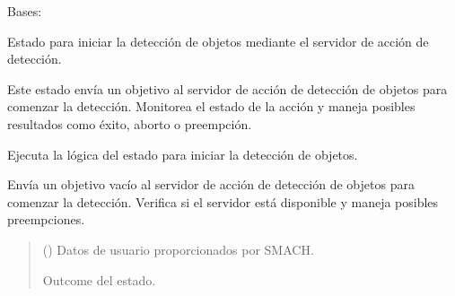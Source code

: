 \documentclass[a4paper,10pt,spanish]{sphinxmanual}
\begin{document}
\begin{fulllineitems}
\label{\detokenize{squad_approach_control_action:squad_approach_control_action.StartObjectDetectionState}}
\pysigstartsignatures
{}
\pysigstopsignatures
\sphinxAtStartPar
Bases: 

\sphinxAtStartPar
Estado para iniciar la detección de objetos mediante el servidor de acción de detección.

\sphinxAtStartPar
Este estado envía un objetivo al servidor de acción de detección de objetos para comenzar
la detección. Monitorea el estado de la acción y maneja posibles resultados como éxito,
aborto o preempción.

\begin{fulllineitems}
\label{\detokenize{squad_approach_control_action:squad_approach_control_action.StartObjectDetectionState.execute}}
\pysigstartsignatures
{}
\pysigstopsignatures
\sphinxAtStartPar
Ejecuta la lógica del estado para iniciar la detección de objetos.

\sphinxAtStartPar
Envía un objetivo vacío al servidor de acción de detección de objetos para comenzar
la detección. Verifica si el servidor está disponible y maneja posibles preempciones.
\begin{quote}\begin{description}
\sphinxAtStartPar
{} () \textendash{} Datos de usuario proporcionados por SMACH.

\sphinxAtStartPar
Outcome del estado.

\sphinxAtStartPar
{}

\end{description}\end{quote}

\end{fulllineitems}


\end{fulllineitems}
\end{document}
